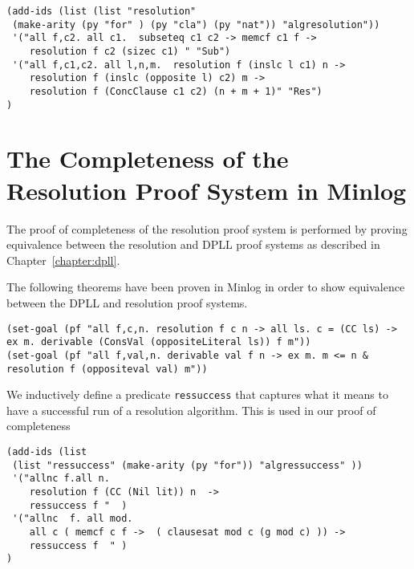 \begin{lstlisting}
(add-ids (list (list "resolution" 
 (make-arity (py "for" ) (py "cla") (py "nat")) "algresolution"))
 '("all f,c2. all c1.  subseteq c1 c2 -> memcf c1 f -> 
    resolution f c2 (sizec c1) " "Sub")
 '("all f,c1,c2. all l,n,m.  resolution f (inslc l c1) n -> 
    resolution f (inslc (opposite l) c2) m -> 
    resolution f (ConcClause c1 c2) (n + m + 1)" "Res")
)
\end{lstlisting}

\section{The Completeness of the Resolution Proof System in Minlog}
The proof of completeness of the resolution proof system is performed by proving equivalence between the resolution and DPLL proof systems as described in Chapter~\ref{chapter:dpll}.  
\begin{comment}
\begin{center}
\texttt{(set-goal  (pf "all f,c. all c0,n. resolution f c n  -> (memcf c0 f -> F) -> resolution (conccf c0 f) c n "))}
\end{center}

\begin{center}
\texttt{(set-goal (pf "all f,c. all c0,l0,n.  resolution f c n -> memcf c0 f -> ex m. m <= n +1 \& resolution (conccf(inslc  l0 c0)   (remcf c0 f)) (inslc l0 c) m "))}
\end{center}
\end{comment}

The following theorems have been proven in Minlog in order to show equivalence between the DPLL and resolution proof systems. 
\begin{center}
\texttt{(set-goal (pf "all f,c,n. resolution f c n -> all ls. c = (CC ls) -> ex m.  derivable (ConsVal (oppositeLiteral ls)) f m"))} \\
\texttt{(set-goal (pf "all f,val,n. derivable val f n -> ex m. m <= n \& resolution f (oppositeval val) m"))}
\end{center}

We inductively define a predicate \texttt{ressuccess} that captures what it means to have a successful run of a resolution algorithm. This is used in our proof of completeness 

\begin{lstlisting}[caption = "The Inductive Definition of Resolution Completeness"]
(add-ids (list 
 (list "ressuccess" (make-arity (py "for")) "algressuccess" ))
 '("allnc f.all n.                                                                                                                                           
    resolution f (CC (Nil lit)) n  ->                                                                                                    
    ressuccess f "  )
 '("allnc  f. all mod.                                                                                                                                 
    all c ( memcf c f ->  ( clausesat mod c (g mod c) )) ->                                                                
    ressuccess f  " )
)
\end{lstlisting}




